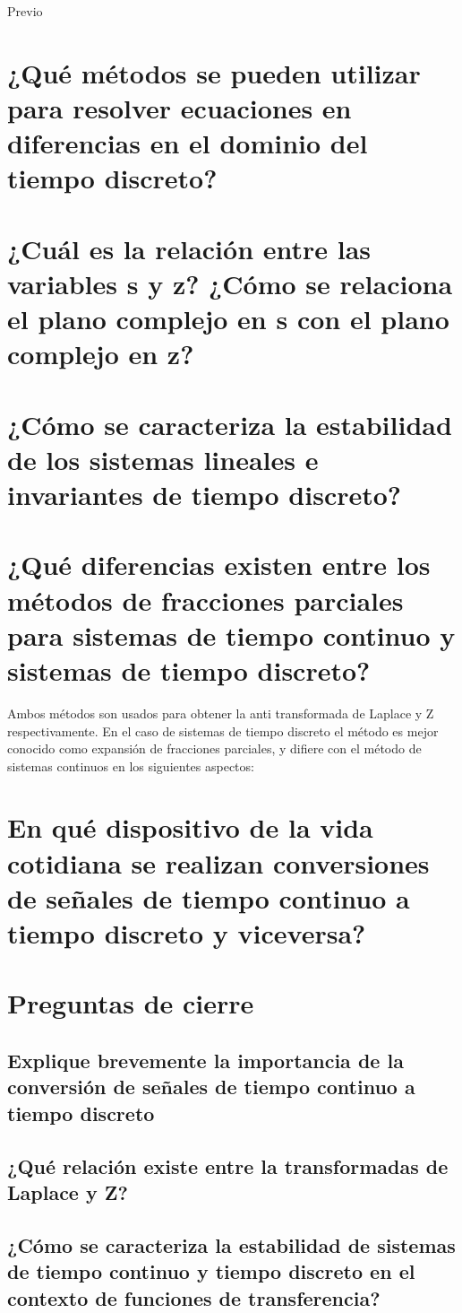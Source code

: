 {\Huge Previo }

\noindent \justifying


\section{¿Qué métodos se pueden utilizar para resolver ecuaciones en diferencias en el dominio del tiempo discreto?} 
\section{¿Cuál es la relación entre las variables s y z? ¿Cómo se relaciona el plano complejo en s con el plano complejo en z?}
\section{¿Cómo se caracteriza la estabilidad de los sistemas lineales e invariantes de tiempo discreto?}
\section{¿Qué diferencias existen entre los métodos de fracciones parciales para sistemas de tiempo continuo y sistemas de tiempo discreto?}
Ambos métodos son usados para obtener la anti transformada de Laplace y Z respectivamente. En el caso de sistemas de tiempo discreto el método es mejor conocido como expansión de fracciones parciales, y difiere con el método de sistemas continuos en los siguientes aspectos:
\section{En qué dispositivo de la vida cotidiana se realizan conversiones de señales de tiempo continuo a tiempo discreto y viceversa?}

\section{Preguntas de cierre}

\subsection{Explique brevemente la importancia de la conversión de señales de tiempo continuo a tiempo discreto}
\subsection{¿Qué relación existe entre la transformadas de Laplace y Z?}
\subsection{¿Cómo se caracteriza la estabilidad de sistemas de tiempo continuo y tiempo discreto en el contexto de funciones de transferencia?}
